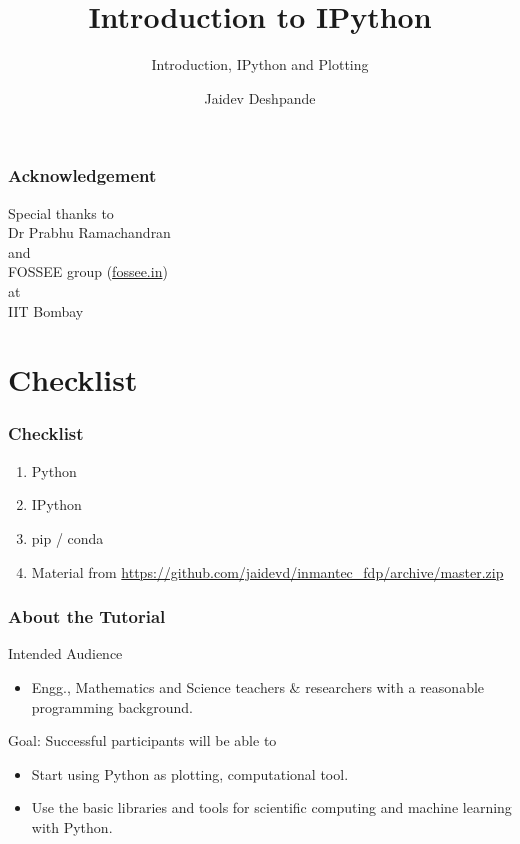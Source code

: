 \documentclass[14pt,compress]{beamer}
\title[Interactive Python]{Introduction to IPython}
\subtitle{Introduction, IPython and Plotting}
\author[Jaidev Deshpande] {Jaidev Deshpande}
\institute[jaidev@jsm.email] {Juxt SmartMandate Analytical Solutions Pvt
Ltd}
\begin{document}
\begin{frame}
  \maketitle
\end{frame}


\begin{frame}
    \frametitle{Acknowledgement}
    \Large
    \begin{center}
        Special thanks to\\
        \alert{Dr Prabhu Ramachandran}\\
        and\\
        \alert{FOSSEE group (\url{fossee.in})} \\
        at\\
        IIT Bombay\\
    \end{center}
\end{frame}

\section{Checklist}
\begin{frame}
\frametitle{Checklist}
  \begin{enumerate}
    \item Python
    \item IPython
    \item pip / conda
    \item Material from \url{https://github.com/jaidevd/inmantec_fdp/archive/master.zip}
  \end{enumerate}
\end{frame}

\begin{frame}
  \frametitle{About the Tutorial}
  \begin{block}{Intended Audience}
  \begin{itemize}
      \item Engg., Mathematics and Science teachers \& researchers with a
           reasonable programming background.
  \end{itemize}
  \end{block}

  \begin{block}{Goal: Successful participants will be able to}
    \begin{itemize}
      \item Start using Python as plotting, computational tool.
      \item Use the basic libraries and tools for scientific computing and
          machine learning with Python.
    \end{itemize}
  \end{block}
\end{frame}
\end{document}
